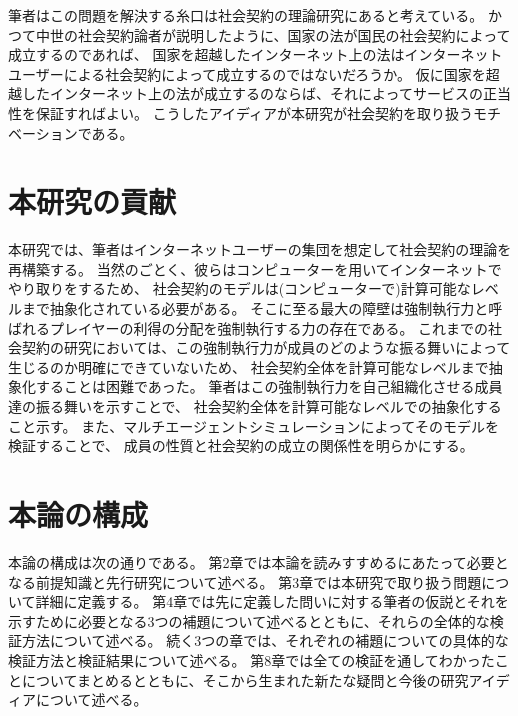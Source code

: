   筆者はこの問題を解決する糸口は社会契約の理論研究にあると考えている。
  かつて中世の社会契約論者が説明したように、国家の法が国民の社会契約によって成立するのであれば、
  国家を超越したインターネット上の法はインターネットユーザーによる社会契約によって成立するのではないだろうか。
  仮に国家を超越したインターネット上の法が成立するのならば、それによってサービスの正当性を保証すればよい。
  こうしたアイディアが本研究が社会契約を取り扱うモチベーションである。

  \section{本研究の貢献}
  本研究では、筆者はインターネットユーザーの集団を想定して社会契約の理論を再構築する。
  当然のごとく、彼らはコンピューターを用いてインターネットでやり取りをするため、
  社会契約のモデルは(コンピューターで)計算可能なレベルまで抽象化されている必要がある。
  そこに至る最大の障壁は強制執行力と呼ばれるプレイヤーの利得の分配を強制執行する力の存在である。
  これまでの社会契約の研究においては、この強制執行力が成員のどのような振る舞いによって生じるのか明確にできていないため、
  社会契約全体を計算可能なレベルまで抽象化することは困難であった。
  筆者はこの強制執行力を自己組織化させる成員達の振る舞いを示すことで、
  社会契約全体を計算可能なレベルでの抽象化すること示す。
  また、マルチエージェントシミュレーションによってそのモデルを検証することで、
  成員の性質と社会契約の成立の関係性を明らかにする。

  \section{本論の構成}
  本論の構成は次の通りである。
  第2章では本論を読みすすめるにあたって必要となる前提知識と先行研究について述べる。
  第3章では本研究で取り扱う問題について詳細に定義する。
  第4章では先に定義した問いに対する筆者の仮説とそれを示すために必要となる3つの補題について述べるとともに、それらの全体的な検証方法について述べる。
  続く3つの章では、それぞれの補題についての具体的な検証方法と検証結果について述べる。
  第8章では全ての検証を通してわかったことについてまとめるとともに、そこから生まれた新たな疑問と今後の研究アイディアについて述べる。
